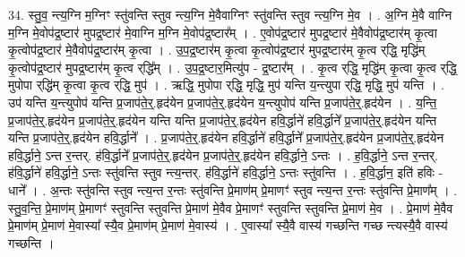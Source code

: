 \documentclass[17pt]{extarticle}
\begin{document}
34. स्तु॒व॒ न्त्य॒ग्नि म॒ग्निꣳ स्तु॑वन्ति स्तुव न्त्य॒ग्नि मे॒वैवाग्निꣳ स्तु॑वन्ति स्तुव न्त्य॒ग्नि मे॒व । . अ॒ग्नि मे॒वै वाग्नि म॒ग्नि मे॒वोप॑द्र॒ष्टार॑ मुपद्र॒ष्टार॑ मे॒वाग्नि म॒ग्नि मे॒वोप॑द्र॒ष्टार᳚म् । . ए॒वोप॑द्र॒ष्टार॑ मुपद्र॒ष्टार॑ मे॒वैवोप॑द्र॒ष्टार॑म् कृ॒त्वा कृ॒त्वोप॑द्र॒ष्टार॑ 
मे॒वैवोप॑द्र॒ष्टार॑म् कृ॒त्वा । . उ॒प॒द्र॒ष्टार॑म् कृ॒त्वा कृ॒त्वोप॑द्र॒ष्टार॑ मुपद्र॒ष्टार॑म् कृ॒त्व र्‌द्धि॒ मृद्धि॑म् 
कृ॒त्वोप॑द्र॒ष्टार॑ मुपद्र॒ष्टार॑म् कृ॒त्व र्‌द्धि᳚म् । . उ॒प॒द्र॒ष्टार॒मित्यु॑प - द्र॒ष्टार᳚म् । . कृ॒त्व र्‌द्धि॒ मृद्धि॑म् कृ॒त्वा कृ॒त्व र्‌द्धि॒ मुपोपा र्‌द्धि॑म् कृ॒त्वा कृ॒त्व र्‌द्धि॒ मुप॑ । . ऋद्धि॒ मुपोपा र्‌द्धि॒ मृद्धि॒ मुप॑ यन्ति य॒न्त्युपा र्‌द्धि॒ मृद्धि॒ मुप॑ यन्ति । . उप॑ यन्ति य॒न्त्युपोप॑ यन्ति प्र॒जाप॑ते॒र्॒.हृद॑येन प्र॒जाप॑ते॒र्॒.हृद॑येन य॒न्त्युपोप॑ यन्ति प्र॒जाप॑ते॒र्॒.हृद॑येन । . य॒न्ति॒ प्र॒जाप॑ते॒र्॒.हृद॑येन प्र॒जाप॑ते॒र्॒.हृद॑येन यन्ति यन्ति प्र॒जाप॑ते॒र्॒.हृद॑येन हवि॒र्द्धाने॑ हवि॒र्द्धाने᳚ प्र॒जाप॑ते॒र्॒.हृद॑येन यन्ति यन्ति प्र॒जाप॑ते॒र्॒.हृद॑येन हवि॒र्द्धाने᳚ । . प्र॒जाप॑ते॒र्॒.हृद॑येन हवि॒र्द्धाने॑ हवि॒र्द्धाने᳚ प्र॒जाप॑ते॒र्॒.हृद॑येन प्र॒जाप॑ते॒र्॒.हृद॑येन हवि॒र्द्धाने॒ ऽन्त र॒न्तर्. ह॑वि॒र्द्धाने᳚ प्र॒जाप॑ते॒र्॒.हृद॑येन प्र॒जाप॑ते॒र्॒.हृद॑येन हवि॒र्द्धाने॒ ऽन्तः । . ह॒वि॒र्द्धाने॒ ऽन्त र॒न्तर्. ह॑वि॒र्द्धाने॑ हवि॒र्द्धाने॒ ऽन्तः स्तु॑वन्ति स्तुव न्त्य॒न्तर्. ह॑वि॒र्द्धाने॑ हवि॒र्द्धाने॒ ऽन्तः स्तु॑वन्ति । . ह॒वि॒र्द्धान॒ इति॑ हविः - धाने᳚ । . अ॒न्तः स्तु॑वन्ति स्तुव न्त्य॒न्त र॒न्तः स्तु॑वन्ति प्रे॒माण॑म् प्रे॒माणꣳ॑ स्तुव न्त्य॒न्त र॒न्तः स्तु॑वन्ति प्रे॒माण᳚म् । . स्तु॒व॒न्ति॒ प्रे॒माण॑म् प्रे॒माणꣳ॑ स्तुवन्ति स्तुवन्ति प्रे॒माण॑ मे॒वैव प्रे॒माणꣳ॑ स्तुवन्ति स्तुवन्ति प्रे॒माण॑ मे॒व । . प्रे॒माण॑ मे॒वैव प्रे॒माण॑म् प्रे॒माण॑ मे॒वास्या᳚ स्यै॒व प्रे॒माण॑म् प्रे॒माण॑ मे॒वास्य॑ । . ए॒वास्या᳚ स्यै॒वै वास्य॑ गच्छन्ति गच्छ न्त्यस्यै॒वै वास्य॑ गच्छन्ति । \newline
\end{document}
